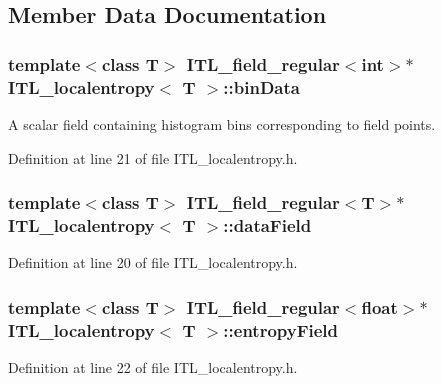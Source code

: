 \subsection{Member Data Documentation}
\hypertarget{classITL__localentropy_a89630418121dbe6869cdea704e7d33f3}{
\subsubsection[{binData}]{\setlength{\rightskip}{0pt plus 5cm}template$<$class T$>$ {\bf ITL\_\-field\_\-regular}$<$int$>$$\ast$ {\bf ITL\_\-localentropy}$<$ T $>$::{\bf binData}}}
\label{classITL__localentropy_a89630418121dbe6869cdea704e7d33f3}


A scalar field containing histogram bins corresponding to field points. 



Definition at line 21 of file ITL\_\-localentropy.h.

\hypertarget{classITL__localentropy_aac95adfde1b819d6ef14426515ec4183}{
\subsubsection[{dataField}]{\setlength{\rightskip}{0pt plus 5cm}template$<$class T$>$ {\bf ITL\_\-field\_\-regular}$<$T$>$$\ast$ {\bf ITL\_\-localentropy}$<$ T $>$::{\bf dataField}}}
\label{classITL__localentropy_aac95adfde1b819d6ef14426515ec4183}


Definition at line 20 of file ITL\_\-localentropy.h.

\hypertarget{classITL__localentropy_aab1116212e70c828f868d5d916e710fd}{
\subsubsection[{entropyField}]{\setlength{\rightskip}{0pt plus 5cm}template$<$class T$>$ {\bf ITL\_\-field\_\-regular}$<$float$>$$\ast$ {\bf ITL\_\-localentropy}$<$ T $>$::{\bf entropyField}}}
\label{classITL__localentropy_aab1116212e70c828f868d5d916e710fd}


Definition at line 22 of file ITL\_\-localentropy.h.

